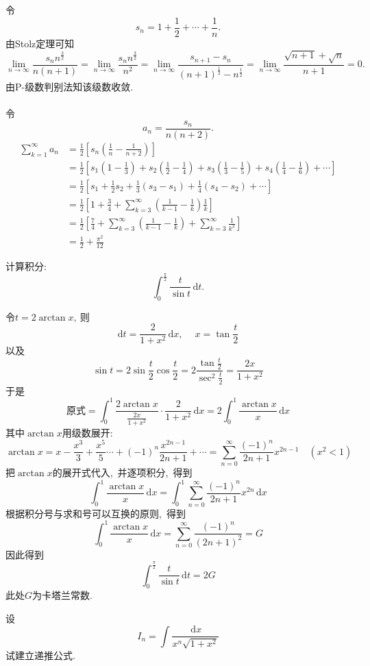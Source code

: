 	\begin{solution}
		令
		$$s_n=1+\frac{1}{2}+\cdots+\frac{1}{n}.$$
		由Stolz定理可知
		$$
		\lim\limits_{n\rightarrow\infty}\frac{s_nn^\frac{3}{2}}{n(n+1)}=\lim\limits_{n\rightarrow\infty}\frac{s_nn^\frac{3}{2}}{n^2}=\lim\limits_{n\rightarrow\infty}\frac{s_{n+1}-s_n}{(n+1)^{\frac{1}{2}}-n^{\frac{1}{2}}}=\lim\limits_{n\rightarrow\infty}\frac{\sqrt{n+1}+\sqrt{n}}{n+1}=0.
		$$
		由$\mathrm{P}$-级数判别法知该级数收敛.\\
		~\\
		令$$a_n=\frac{s_n}{n(n+2)}.$$
		\begin{align*}
			\sum\limits_{k=1}^{\infty}a_n&=\frac{1}{2}\left[s_n\left(\frac{1}{n}-\frac{1}{n+2}\right)\right]\\
			&=\frac{1}{2}\left[s_1\left(1-\frac{1}{3}\right)+s_2\left(\frac{1}{2}-\frac{1}{4}\right)+s_3\left(\frac{1}{3}-\frac{1}{5}\right)+s_4\left(\frac{1}{4}-\frac{1}{6}\right)+\cdots\right]\\
			&=\frac{1}{2}\left[s_1+\frac{1}{2}s_2+\frac{1}{3}(s_3-s_1)+\frac{1}{4}(s_4-s_2)
			+\cdots\right]\\
			&=\frac{1}{2}\left[1+\frac{3}{4}+\sum\limits_{k=3}^{\infty}\left(\frac{1}{k-1}-\frac{1}{k}\right)\frac{1}{k}\right]\\
			&=\frac{1}{2}\left[\frac{7}{4}+\sum\limits_{k=3}^{\infty}\left(\frac{1}{k-1}-\frac{1}{k}\right)+\sum\limits_{k=3}^{\infty}\frac{1}{k^2}\right]\\
			&=\frac{1}{2}+\frac{\pi^2}{12}
		\end{align*}
	\end{solution}
	
	\newpage
	\begin{problem}
		计算积分:
		$$\int_{0}^{\frac{\pi}{2}}\frac{t}{\sin t}\,\text{d}t.$$
	\end{problem}
	
	\begin{solution}
		令$t=2\arctan x,\ $则
		$$\text{d}t=\frac{2}{1+x^2}\,\text{d}x,\ \quad x=\tan\frac{t}{2}$$
		以及
		$$\sin t=2\sin\frac{t}{2}\cos\frac{t}{2}=2\frac{\tan\frac{t}{2}}{\sec^2\frac{t}{2}}=\frac{2x}{1+x^2}$$
		于是
		$$\text{原式}=\int_{0}^{1}\frac{2\arctan x}{\frac{2x}{1+x^2}}\cdot\frac{2}{1+x^2}\,\text{d}x=2\int_{0}^{1}\frac{\arctan x}{x}\,\text{d}x$$
		其中$\arctan x$用级数展开:
		$$\arctan x=x-\frac{x^3}{3}+\frac{x^5}{5}\cdots+(-1)^n\frac{x^{2n-1}}{2n+1}+\cdots=\sum\limits_{n=0}^{\infty}\frac{(-1)^n}{2n+1}x^{2n-1}\quad (x^2<1)$$
		把$\arctan x$的展开式代入,\ 并逐项积分,\ 得到
		$$\int_{0}^{1}\frac{\arctan x}{x}\,\text{d}x=\int_{0}^{1}\sum\limits_{n=0}^{\infty}\frac{(-1)^n}{2n+1}x^{2n}\,\text{d}x$$
		根据积分号与求和号可以互换的原则,\ 得到
		$$\int_{0}^{1}\frac{\arctan x}{x}\,\text{d}x=\sum\limits_{n=0}^{\infty}\frac{(-1)^n}{(2n+1)^2}=G$$
		因此得到
		$$\int_{0}^{\frac{\pi}{2}}\frac{t}{\sin t}\,\text{d}t=2G$$
		此处$G$为卡塔兰常数.
	\end{solution}
	\newpage
	\begin{problem}
		设$$I_n=\int \frac{\,\text{d}x}{x^n\sqrt{1+x^2}}$$试建立递推公式.
	\end{problem}
	
